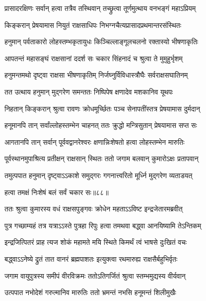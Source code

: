 \twolineshloka
{प्रासादरक्षिणः सर्वान् हत्वा तत्रैव तस्थिवान्}
{तच्छ्रुत्वा तूर्णमुत्थाय वनभङ्गं महाऽप्रियम्} %

\twolineshloka
{किङ्करान् प्रेषयामास नियुतं राक्षसाधिपः}
{निभग्नचैत्यप्रासादप्रथमान्तरसंस्थितः} %

\twolineshloka
{हनुमान् पर्वताकारो लोहस्तम्भकृतायुधः}
{किञ्चिल्लाङ्गूलचलनो रक्तास्यो भीषणाकृतिः} %

\twolineshloka
{आपतन्तं महासङ्घं राक्षसानां ददर्श सः}
{चकार सिंहनादं च श्रुत्वा ते मुमुहुर्भृशम्} %

\twolineshloka
{हनुमन्तमथो दृष्ट्वा राक्षसा भीषणाकृतिम्}
{निर्जघ्नुर्विविधास्त्रौघैः सर्वराक्षसघातिनम्} %

\twolineshloka
{तत उत्थाय हनुमान् मुद्गरेण समन्ततः}
{निष्पिपेष क्षणादेव मशकानिव यूथपः} %

\twolineshloka
{निहतान् किङ्करान् श्रुत्वा रावणः क्रोधमूर्च्छितः}
{पञ्च सेनापतींस्तत्र प्रेषयामास दुर्मदान्} %

\twolineshloka
{हनूमानपि तान् सर्वांल्लोहस्तम्भेन चाहनत्}
{ततः क्रुद्धो मन्त्रिसुतान् प्रेषयामास सप्त सः} %

\twolineshloka
{आगतानपि तान् सर्वान् पूर्ववद्वानरेश्वरः}
{क्षणान्निःशेषतो हत्वा लोहस्तम्भेन मारुतिः} %

\twolineshloka
{पूर्वस्थानमुपाश्रित्य प्रतीक्षन् राक्षसान् स्थितः}
{ततो जगाम बलवान् कुमारोऽक्षः प्रतापवान्} %

\twolineshloka
{तमुत्पपात हनुमान् दृष्ट्वाऽऽकाशे समुद्गरः}
{गगनात्त्वरितो मूर्ध्नि मुद्गरेण व्यताडयत्} %

{हत्वा तमक्षं निःशेषं बलं सर्वं चकार सः॥८८॥} %


\twolineshloka
{ततः श्रुत्वा कुमारस्य वधं राक्षसपुङ्गवः}
{क्रोधेन महताऽऽविष्ट इन्द्रजेतारमब्रवीत्} %

\twolineshloka
{पुत्र गच्छाम्यहं तत्र यत्राऽऽस्ते पुत्रहा रिपुः}
{हत्वा तमथवा बद्ध्वा आनयिष्यामि तेऽन्तिकम्} %

\twolineshloka
{इन्द्रजित्पितरं प्राह त्यज शोकं महामते}
{मयि स्थिते किमर्थं त्वं भाषसे दुःखितं वचः} %

\twolineshloka
{बद्ध्वाऽऽनेष्ये द्रुतं तात वानरं ब्रह्मपाशतः}
{इत्युक्त्वा रथमारुह्य राक्षसैर्बहुभिर्वृतः} %

\twolineshloka
{जगाम वायुपुत्रस्य समीपं वीरविक्रमः}
{ततोऽतिगर्जितं श्रुत्वा स्तम्भमुद्यस्य वीर्यवान्} %

\twolineshloka
{उत्पपात नभोदेशं गरुत्मानिव मारुतिः}
{ततो भ्रमन्तं नभसि हनूमन्तं शिलीमुखैः} %


